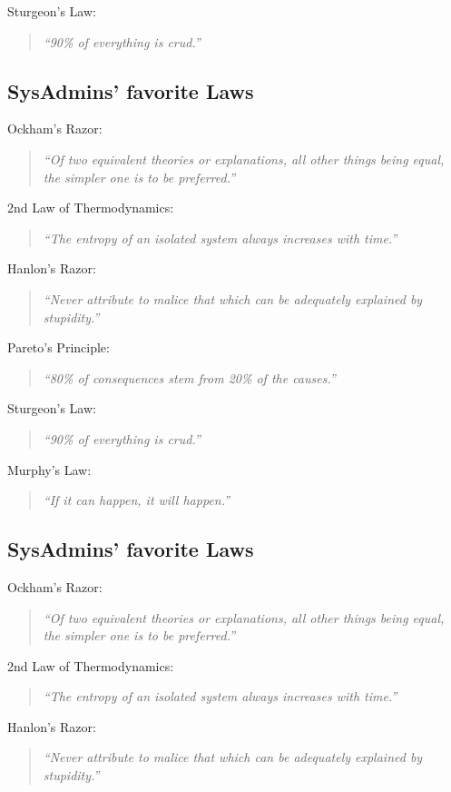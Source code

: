 \documentclass[xga]{xdvislides}
\newcommand{\smallish}{\fontsize{18}{18}\selectfont}
\begin{document}
Sturgeon's Law:
\begin{quote}
{\em ``90\% of everything is crud.''}
\end{quote}
\Normalsize

\subsection{SysAdmins' favorite Laws}
\smallish
Ockham's Razor:
\begin{quote}
{\em ``Of two equivalent theories or explanations, all other things being
equal, the simpler one is to be preferred.''}
\end{quote}

2nd Law of Thermodynamics:
\begin{quote}
{\em ``The entropy of an isolated system always increases with time.''}
\end{quote}

Hanlon's Razor:
\begin{quote}
{\em ``Never attribute to malice that which can be adequately explained by
stupidity.''}
\end{quote}

Pareto's Principle:
\begin{quote}
{\em ``80\% of consequences stem from 20\% of the causes.''}
\end{quote}

Sturgeon's Law:
\begin{quote}
{\em ``90\% of everything is crud.''}
\end{quote}

Murphy's Law:
\begin{quote}
{\em ``If it can happen, it will happen.''}
\end{quote}
\Normalsize


\subsection{SysAdmins' favorite Laws}
\smallish
Ockham's Razor:
\begin{quote}
{\em ``Of two equivalent theories or explanations, all other things being
equal, the simpler one is to be preferred.''}
\end{quote}

2nd Law of Thermodynamics:
\begin{quote}
{\em ``The entropy of an isolated system always increases with time.''}
\end{quote}

Hanlon's Razor:
\begin{quote}
{\em ``Never attribute to malice that which can be adequately explained by
stupidity.''}
\end{quote}
\end{document}

